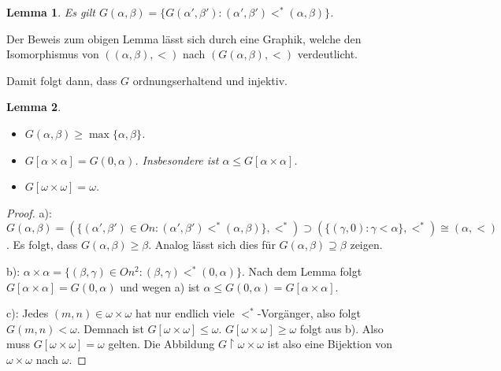 \documentclass[german]{article}
\theoremstyle{break}
\theoremstyle{def_style}
\theoremstyle{def_style}
\theoremstyle{lemma_style}
\newtheorem{lemma}{Lemma}[subsection]
\begin{document}
\begin{lemma}
	Es gilt $G(\alpha,\beta)=\{G(\alpha',\beta'):(\alpha',\beta')<^\ast(\alpha,\beta)\}$.
\end{lemma}
Der Beweis zum obigen Lemma lässt sich durch eine Graphik, welche den Isomorphismus von $((\alpha,\beta),<)$ nach $(G(\alpha,\beta), <)$ verdeutlicht.

Damit folgt dann, dass $G$ ordnungserhaltend und injektiv.

\begin{lemma}
	\begin{itemize}
		\item[a)] $G(\alpha, \beta)\geq\max\{\alpha,\beta\}$.
		\item[b)] $G[\alpha\times\alpha]=G(0,\alpha)$. Insbesondere ist $\alpha \leq G[\alpha\times\alpha]$.
		\item[c)] $G[\omega\times\omega]=\omega$.
	\end{itemize}
\end{lemma}
\begin{proof}
	a): $G(\alpha,\beta)=(\{(\alpha',\beta')\in On : (\alpha',\beta')<^\ast(\alpha,\beta)\}, <^\ast)\supset(\{(\gamma,0):\gamma<\alpha\}, <^\ast)\cong(\alpha,<)$. Es folgt, dass $G(\alpha,\beta)\geq\beta$. Analog lässt sich dies für $G(\alpha,\beta)\supseteq\beta$ zeigen.
	
	b): $\alpha\times\alpha=\{(\beta,\gamma)\in On^2 : (\beta,\gamma)<^\ast(0,\alpha)\}$. Nach dem Lemma folgt $G[\alpha\times\alpha]=G(0,\alpha)$ und wegen a) ist $\alpha\leq G(0,\alpha)=G[\alpha\times \alpha]$.
	
	c): Jedes $(m,n)\in\omega\times\omega$ hat nur endlich viele $<^\ast$-Vorgänger, also folgt $G(m,n)<\omega$. Demnach ist $G[\omega\times\omega]\leq\omega$. $G[\omega\times\omega]\geq\omega$ folgt aus b). Also muss $G[\omega\times\omega]=\omega$ gelten. Die Abbildung $G\upharpoonright\omega\times\omega$ ist also eine Bijektion von $\omega\times\omega$ nach $\omega$.
\end{proof}
\end{document}
